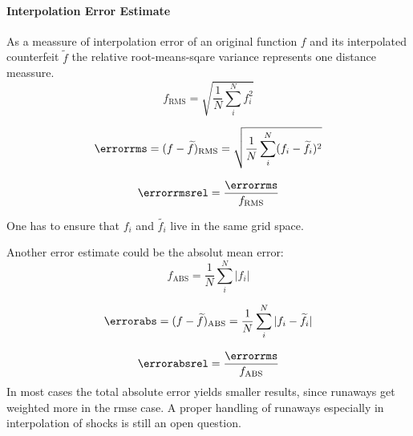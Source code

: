 \paragraph{Interpolation Error Estimate}

As a meassure of interpolation error of an original function $f$ and its
interpolated counterfeit $\widetilde{f}$ the relative root-means-sqare variance
represents one distance meassure.
\begin{equation}
    f_{\text{RMS}} = \sqrt{\frac{1}{N} \sum^N_i f^2_i} 
\end{equation}

\begin{equation}
    \errorrms = (f - \widetilde{f})_{\text{RMS}} = \sqrt{\frac{1}{N} \sum^N_i (f_i - \widetilde{f_i})^2} 
\end{equation}

\begin{equation}
    \errorrmsrel = \frac{\errorrms}{f_{\text{RMS}}} 
\end{equation}

One has to ensure that $f_i$ and $\widetilde{f_i}$ live in the same grid space.

Another error estimate could be the absolut mean error:
\begin{equation}
    f_{\text{ABS}} = \frac{1}{N}\sum^N_i |f_i| 
\end{equation}

\begin{equation}
    \errorabs = (f - \widetilde{f})_{\text{ABS}} = \frac{1}{N}\sum^N_i |f_i - \widetilde{f_i}| 
\end{equation}

\begin{equation}
    \errorabsrel = \frac{\errorrms}{f_{\text{ABS}}} 
\end{equation}
In most cases the total absolute error yields smaller results, since runaways
get weighted more in the rmse case. A proper handling of runaways especially in
interpolation of shocks is still an open question.
